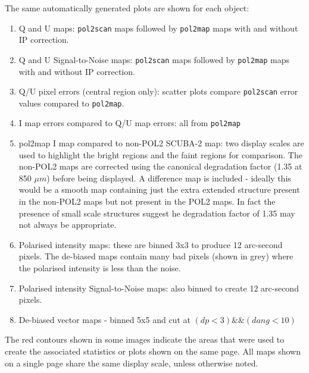 \documentclass[twoside,11pt]{starlink}
\begin{document}
The same automatically generated plots are shown for each object:
\begin{enumerate}
\item Q and U maps: \texttt{pol2scan} maps followed by \texttt{pol2map}
maps with and without IP correction.
\item Q and U Signal-to-Noise maps: \texttt{pol2scan} maps followed by
\texttt{pol2map} maps with and without IP correction.
\item Q/U pixel errors (central region only): scatter plots compare
\texttt{pol2scan} error values compared to \texttt{pol2map}.
\item I map errors compared to Q/U map errors: all from \texttt{pol2map}
\item pol2map I map compared to non-POL2 SCUBA-2 map: two display scales
are used to highlight the bright regions and the faint regions for
comparison. The non-POL2 maps are corrected using the canonical
degradation factor (1.35 at 850 $\mu m$) before being displayed. A
difference map is included - ideally this would be a smooth map
containing just the extra extended structure present in the non-POL2 maps
but not present in the POL2 maps. In fact the presence of small scale
structures suggest he degradation factor of 1.35 may not always be
appropriate.
\item Polarised intensity maps: these are binned 3x3 to produce 12
arc-second pixels. The de-biased maps contain many bad pixels (shown in
grey) where the polarised intensity is less than the noise.
\item Polarised intensity Signal-to-Noise maps: also binned to create 12
arc-second pixels.
\item De-biased vector maps - binned 5x5 and cut at $(dp<3)\&\&(dang<10)$
\end{enumerate}

The red contours shown in some images indicate the areas that were used
to create the associated statistics or plots shown on the same page. All
maps shown on a single page share the same display scale, unless
otherwise noted.
\end{document}
